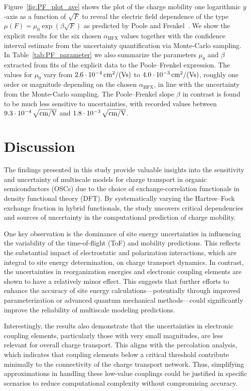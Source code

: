 \documentclass[%
 reprint,
superscriptaddress,
 amsmath,amssymb,
 aps,
prb,
floatfix
]{revtex4-2}
\newcommand{\bjoern}[2]{{\color{blue}{{\bf #1} #2}}}
\newcommand{\ahfx}{\ensuremath{\alpha_\text{HFX}}\xspace}
\begin{document}
Figure~\ref{fig:PF_plot_ave} shows the plot of the charge mobility one logarithmic $y$-axis as a function of $\sqrt{F}$ to reveal the electric field dependence of the type $\mu(F)=\mu_0 \exp (\beta \sqrt{F})$ as predicted by Poole and Frenkel~\cite{frenkel_prebreakdown_1938}. We show the explicit results for the six chosen \ahfx values together with the confidence interval estimate from the uncertainty quantification via Monte-Carlo sampling. In Table~\ref{tab:PF_parameter} we also summarize the  parameters $\mu_0$ and $\beta$ extracted from fits of the explicit data to the Poole--Frenkel expression. The values for $\mu_0$ vary from $\unit[2.6\cdot 10^{-4}]{cm^2/(Vs)}$ to $\unit[4.0\cdot 10^{-3}]{cm^2/(Vs)}$, roughly one order or magnitude depending on the chosen \ahfx, in line with the uncertainty from the Monte-Carlo sampling. The Poole--Frenkel slope $\beta$ in contrast is found to be much less sensitive to uncertainties, with recorded values between $\unit[9.3\cdot 10^{-4}]{\sqrt{cm/V}}$ and $\unit[1.8\cdot 10^{-3}]{\sqrt{cm/V}}$.

\bjoern{STOP}{HERE}
\section{Discussion}
The findings presented in this study provide valuable insights into the sensitivity and uncertainty of multiscale models for charge transport in organic semiconductors (OSCs) due to the choice of exchange-correlation functionals in density functional theory (DFT). By systematically varying the Hartree--Fock exchange fraction  in hybrid functionals, the study uncovers critical dependencies and sources of uncertainty in the computational prediction of charge mobility.  

One key observation is the dominance of site energy uncertainties in influencing the variability of the time-of-flight (ToF) and mobility predictions. This reflects the substantial impact of electrostatic and polarization interactions, which are integral to site energy determination, on charge transport dynamics. In contrast, the uncertainties in reorganization energies and electronic coupling elements are shown to have a relatively minor effect. This suggests that further efforts to enhance the accuracy of site energy calculations—potentially through improved parameterization or advanced quantum mechanical methods—could significantly improve the reliability of multiscale modeling predictions.  

Interestingly, the results also demonstrate that the uncertainties in electronic coupling elements, particularly those with very small magnitudes, are less relevant for overall charge transport. This aligns with the percolation analysis, which indicates that coupling elements below a critical threshold contribute minimally to the connectivity of the charge transport network. Thus, simplifying approximations in handling these low-value couplings could be justified in specific scenarios to reduce computational complexity without compromising accuracy.  
\end{document}
